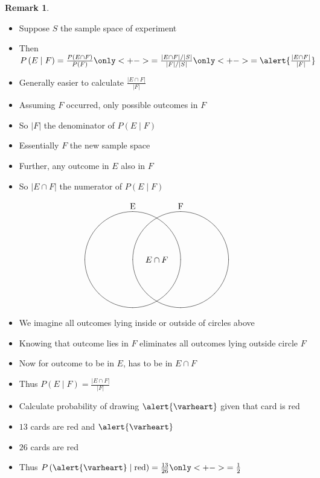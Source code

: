 \documentclass[handout]{beamer}
\theoremstyle{definition}
\newtheorem{remark}{Remark}
\begin{document}
\begin{frame}
\begin{remark}
\begin{itemize}
\item Suppose $S$ the sample space of experiment
\item Then
$P\left(E\mid F\right)=\frac{P\left(E\cap F\right)}{P\left(F\right)}
\only<+->{=\frac{\left|E\cap F\right|/\left|S\right|}
{\left|F\right|/\left|S\right|}}
\only<+->{=\alert{\frac{\left|E\cap F\right|}{\left|F\right|}}}$
\item Generally easier to calculate
$\frac{\left|E\cap F\right|}{\left|F\right|}$
\item Assuming $F$ occurred, only possible outcomes in $F$
\item So $\left|F\right|$ the denominator of $P\left(E\mid F\right)$
\item Essentially $F$ the \alert{new sample space}
\item Further, any outcome in $E$
also in $F$
\item So $\left|E\cap F\right|$ the numerator of
$P\left(E\mid F\right)$
\end{itemize}
\end{remark}
\end{frame}

\begin{frame}
\[\begin{xy}<1cm,0cm>:
(-1,2)*+!D{\text{E}};
(1,2)*+!D{\text{F}};
(-1,0)*\cir<2cm>{};
(1,0)*\cir<2cm>{};
(0,0)*{E\cap F};
\end{xy}\]
\begin{itemize}
\item We imagine all outcomes lying inside
or outside of circles above
\item Knowing that outcome lies in $F$
eliminates all outcomes lying outside circle $F$
\item Now for outcome to be in $E$, has to be in $E\cap F$
\item Thus $P\left(E\mid F\right)=
\frac{\left|E\cap F\right|}{\left|F\right|}$
\end{itemize}
\end{frame}

\begin{frame}
\begin{example}
\begin{itemize}
\item Calculate probability of drawing $\alert{\varheart}$ given
that card is red
\item $13$ cards are red and $\alert{\varheart}$
\item $26$ cards are red
\item Thus $P\left(\alert{\varheart}\mid\text{red}\right)
=\frac{13}{26}\only<+->{=\frac{1}{2}}$
\end{itemize}
\end{example}
\end{frame}
\end{document}
